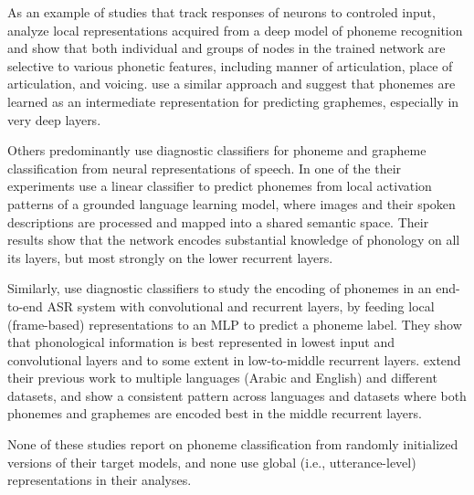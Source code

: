 As an example of studies that track responses of neurons to controled
input, \citet{nagamine2015exploring} analyze local representations
acquired from a deep model of phoneme recognition and show that both
individual and groups of nodes in the trained network are selective to
various phonetic features, including manner of articulation, place of
articulation, and voicing.  \citet{krug2018neuron} use a similar
approach and suggest that phonemes are learned as an intermediate
representation for predicting graphemes, especially in very deep
layers.

Others predominantly use diagnostic classifiers for phoneme and
grapheme classification from neural representations of speech.  In one
of the their experiments \citet{alishahi-etal-2017-encoding} use
a linear classifier to predict phonemes from local activation patterns
of a grounded language learning model, where images and their spoken
descriptions are processed and mapped into a shared semantic
space. Their results show that the network encodes substantial
knowledge of phonology on all its layers, but most strongly on the
lower recurrent layers.

Similarly, \citet{belinkov2017analyzing} use diagnostic classifiers to
study the encoding of phonemes in an end-to-end ASR system with
convolutional and recurrent layers, by feeding local (frame-based)
representations to an MLP to predict a phoneme label.  They show that
phonological information is best represented in lowest input and
convolutional layers and to some extent in low-to-middle recurrent
layers.  \citet{belinkov2019analyzing} extend their previous work to
multiple languages (Arabic and English) and different datasets, and
show a consistent pattern across languages and datasets where both
phonemes and graphemes are encoded best in the middle recurrent
layers.

None of these studies report on phoneme classification from randomly
initialized versions of their target models, and none use global (i.e., utterance-level) 
representations in their analyses.



